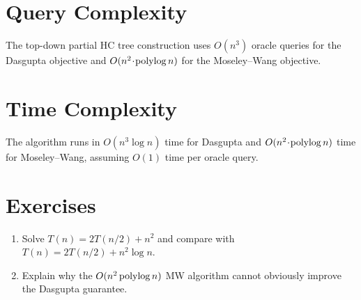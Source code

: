 \section{Query Complexity}

\begin{theorem}
The top-down partial HC tree construction uses $O(n^3)$ oracle queries for the Dasgupta objective and $O(n^2\!\cdot\!\operatorname{polylog} n)$ for the Moseley--Wang objective.
\end{theorem}

\section{Time Complexity}

\begin{theorem}
The algorithm runs in $O(n^3\log n)$ time for Dasgupta and $O(n^2\!\cdot\!\operatorname{polylog} n)$ time for Moseley--Wang, assuming $O(1)$ time per oracle query.
\end{theorem}

\section{Exercises}

\begin{enumerate}
  \item Solve $T(n) = 2T(n/2) + n^2$ and compare with $T(n) = 2T(n/2) + n^2\log n$.
  \item Explain why the $O(n^2\operatorname{polylog} n)$ MW algorithm cannot obviously improve the Dasgupta guarantee.
\end{enumerate}
